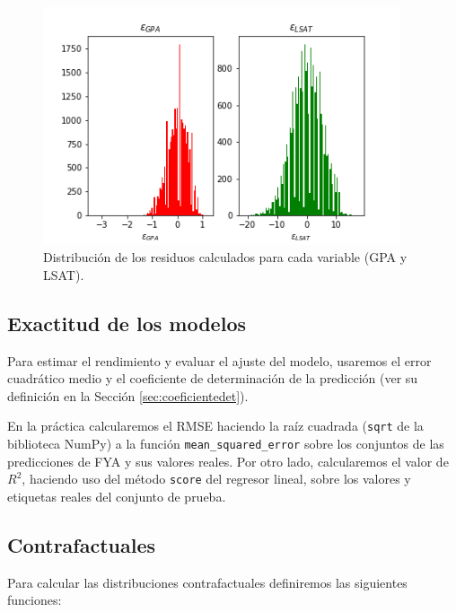 \documentclass[oneside,openright,titlepage,numbers=noenddot,openany,headinclude,footinclude=true,
cleardoublepage=empty,abstractoff,BCOR=5mm,paper=a4,fontsize=12pt,main=spanish]{scrreprt}
\begin{document}
\begin{figure}[h]
	\centering
	\includegraphics[width=10.5cm]{epsilons.png}
	\caption{Distribución de los residuos calculados para cada variable (GPA y LSAT).}
    \label{fig:epsilondistr}
\end{figure}

\subsection{Exactitud de los modelos}

Para estimar el rendimiento y evaluar el ajuste del modelo, usaremos el error cuadrático medio y el coeficiente de determinación de la predicción (ver su definición en la Sección \ref{sec:coeficientedet}).

En la práctica calcularemos el RMSE haciendo la raíz cuadrada (\texttt{sqrt} de la biblioteca NumPy) a la función \texttt{mean\_squared\_error} sobre los conjuntos de las predicciones de FYA y sus valores reales. Por otro lado, calcularemos el valor de $R^2$, haciendo uso del método \texttt{score} del regresor lineal, sobre los valores y etiquetas reales del conjunto de prueba.

\subsection{Contrafactuales}

Para calcular las distribuciones contrafactuales definiremos las siguientes funciones:
\end{document}

